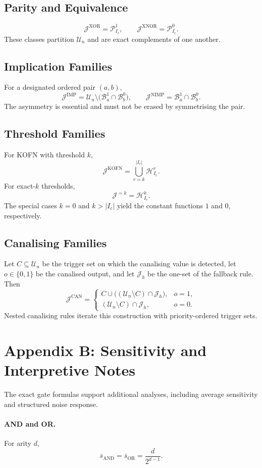 \documentclass[11pt]{article}
\theoremstyle{definition}
\newcommand{\U}{\mathcal{U}_n}
\newcommand{\Ic}{I_c}
\newcommand{\J}{\mathcal{J}}
\newcommand{\Band}[2]{\mathcal{B}_{#1}^{#2}}
\newcommand{\Parity}[2]{\mathcal{P}_{#1}^{#2}}
\newcommand{\Weight}[2]{\mathcal{H}_{#1}^{#2}}
\newcommand{\bits}{\{0,1\}}
\begin{document}
\subsection{Parity and Equivalence}
\[
\J^{\mathrm{XOR}}=\Parity{\Ic}{1},
\qquad
\J^{\mathrm{XNOR}}=\Parity{\Ic}{0}.
\]
These classes partition \(\U\) and are exact complements of one another.

\subsection{Implication Families}
For a designated ordered pair \((a,b)\),
\[
\J^{\mathrm{IMP}}=\U\setminus\bigl(\Band{a}{1}\cap\Band{b}{0}\bigr),
\qquad
\J^{\mathrm{NIMP}}=\Band{a}{1}\cap\Band{b}{0}.
\]
The asymmetry is essential and must not be erased by symmetrising the pair.

\subsection{Threshold Families}
For KOFN with threshold \(k\),
\[
\J^{\mathrm{KOFN}}=\bigcup_{r=k}^{|\Ic|}\Weight{\Ic}{r}.
\]
For exact-\(k\) thresholds,
\[
\J^{=k}=\Weight{\Ic}{k}.
\]
The special cases \(k=0\) and \(k>|\Ic|\) yield the constant functions \(1\) and \(0\), respectively.

\subsection{Canalising Families}
Let \(C\subseteq\U\) be the trigger set on which the canalising value is detected, let \(o\in\bits\) be the canalised output, and let \(\J_h\) be the one-set of the fallback rule. Then
\[
\J^{\mathrm{CAN}}
=
\begin{cases}
C\cup\bigl((\U\setminus C)\cap \J_h\bigr), & o=1,\\[4pt]
(\U\setminus C)\cap \J_h, & o=0.
\end{cases}
\]
Nested canalising rules iterate this construction with priority-ordered trigger sets.

\section{Appendix B: Sensitivity and Interpretive Notes}
The exact gate formulas support additional analyses, including average sensitivity and structured noise response.

\paragraph{AND and OR.}
For arity \(d\),
\[
\bar{s}_{\mathrm{AND}}=\bar{s}_{\mathrm{OR}}=\frac{d}{2^{d-1}}.
\]
\end{document}
